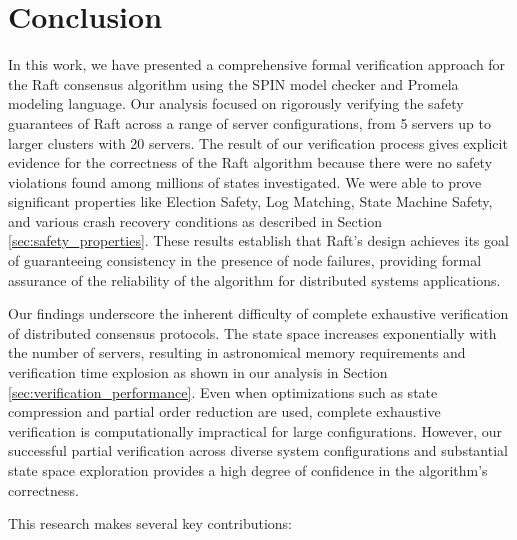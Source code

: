 \documentclass[a4paper]{llncs}
\begin{document}
    
    \section{Conclusion}
    \label{sec:conclusion}

    In this work, we have presented a comprehensive formal verification approach for the Raft consensus algorithm using the SPIN model checker and Promela modeling language. Our analysis focused on rigorously verifying the safety guarantees of Raft across a range of server configurations, from 5 servers up to larger clusters with 20 servers.
The result of our verification process gives explicit evidence for the correctness of the Raft algorithm because there were no safety violations found among millions of states investigated. We were able to prove significant properties like Election Safety, Log Matching, State Machine Safety, and various crash recovery conditions as described in Section \ref{sec:safety_properties}. These results establish that Raft's design achieves its goal of guaranteeing consistency in the presence of node failures, providing formal assurance of the reliability of the algorithm for distributed systems applications.

Our findings underscore the inherent difficulty of complete exhaustive verification of distributed consensus protocols. The state space increases exponentially with the number of servers, resulting in astronomical memory requirements and verification time explosion as shown in our analysis in Section \ref{sec:verification_performance}. Even when optimizations such as state compression and partial order reduction are used, complete exhaustive verification is computationally impractical for large configurations. However, our successful partial verification across diverse system configurations and substantial state space exploration provides a high degree of confidence in the algorithm's correctness.
    
    This research makes several key contributions:
    
\end{document}
